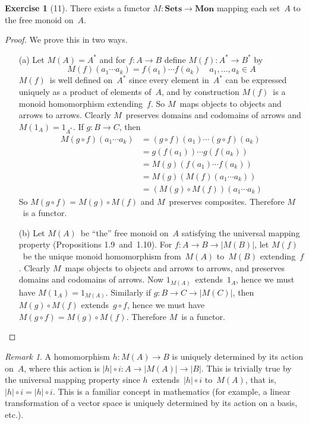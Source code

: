 \documentclass[letterpaper,12pt]{article}
\newcommand{\after}{\circ}
\renewcommand{\star}[1]{#1^{*}}
\newcommand{\cat}[1]{\mathbf{#1}}
\newcommand{\under}[1]{|{#1}|}
\newcommand{\Sets}{\cat{Sets}}
\newcommand{\Mon}{\cat{Mon}}
\theoremstyle{definition}
\newtheorem*{exer}{Exercise}
\theoremstyle{remark}
\newtheorem*{rmk}{Remark}
\theoremstyle{direction}
\begin{document}
\begin{exer}[11]
There exists a functor \(M:\Sets\to\Mon\) mapping each set~\(A\) to the free monoid on~\(A\).
\end{exer}
\begin{proof}
We prove this in two ways.
\begin{enumerate}[itemsep=0pt]
\item[(a)] Let \(M(A)=\star{A}\) and for \(f:A\to B\) define \(M(f):\star{A}\to\star{B}\) by
\[M(f)(a_1\cdots a_k)=f(a_1)\cdots f(a_k)\quad a_1,\ldots,a_k\in A\]
\(M(f)\)~is well defined on~\(\star{A}\) since every element in~\(\star{A}\) can be expressed uniquely as a product of elements of~\(A\), and by construction \(M(f)\)~is a monoid homomorphism extending~\(f\). So \(M\)~maps objects to objects and arrows to arrows. Clearly \(M\)~preserves domains and codomains of arrows and \(M(1_A)=1_{\star{A}}\). If \(g:B\to C\), then
\begin{align*}
M(g\after f)(a_1\cdots a_k)&=(g\after f)(a_1)\cdots(g\after f)(a_k)\\
	&=g(f(a_1))\cdots g(f(a_k))\\
	&=M(g)(f(a_1)\cdots f(a_k))\\
	&=M(g)(M(f)(a_1\cdots a_k))\\
	&=(M(g)\after M(f))(a_1\cdots a_k)
\end{align*}
So \(M(g\after f)=M(g)\after M(f)\) and \(M\)~preserves composites. Therefore \(M\)~is a functor.
\item[(b)] Let \(M(A)\)~be ``the'' free monoid on~\(A\) satisfying the universal mapping property (Propositions 1.9~and~1.10). For \(f:A\to B\to\under{M(B)}\), let \(M(f)\)~be the unique monoid homomorphism from~\(M(A)\) to~\(M(B)\) extending~\(f\). Clearly \(M\)~maps objects to objects and arrows to arrows, and preserves domains and codomains of arrows. Now \(1_{M(A)}\)~extends~\(1_A\), hence we must have \(M(1_A)=1_{M(A)}\). Similarly if \(g:B\to C\to\under{M(C)}\), then \(M(g)\after M(f)\) extends~\(g\after f\), hence we must have \(M(g\after f)=M(g)\after M(f)\). Therefore \(M\)~is a functor.\qedhere
\end{enumerate}
\end{proof}
\begin{rmk}
A homomorphism \(h:M(A)\to B\) is uniquely determined by its action on~\(A\), where this action is \(\under{h}\after i:A\to\under{M(A)}\to\under{B}\). This is trivially true by the universal mapping property since \(h\)~extends~\(\under{h}\after i\) to~\(M(A)\), that is, \(\under{h}\after i=\under{h}\after i\). This is a familiar concept in mathematics (for example, a linear transformation of a vector space is uniquely determined by its action on a basis, etc.).
\end{rmk}
\end{document}
